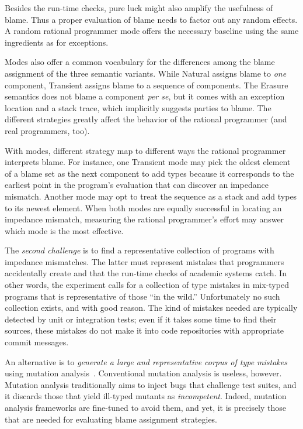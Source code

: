 Besides the run-time checks, pure luck might also amplify the usefulness
of blame. Thus a proper evaluation of blame needs to factor out any random
effects. A random rational programmer mode offers the necessary baseline
using the same ingredients as for exceptions. 


Modes also offer a common vocabulary for the differences among the blame
assignment of the three semantic variants.  While Natural assigns blame to
{\em one\/} component, Transient assigns blame to a sequence of
components. The Erasure semantics does not blame a component {\it per
se\/}, but it comes with an exception location and a stack trace, which
implicitly suggests parties to blame.  The different strategies greatly
affect the behavior of the rational programmer (and real programmers,
too).

With modes, different strategy map to different ways the rational
programmer  interprets blame.  For instance, one Transient mode may pick
the oldest element of a blame set as the next component to add types
because it corresponds to the earliest point in the program's evaluation
that can discover an impedance mismatch.  Another mode may opt to treat
the sequence as a stack and add types to its newest element.  When both
modes are equally successful in locating an impedance mismatch, measuring
the rational programmer's effort may answer which mode is the most
effective.



The {\em second challenge\/} is to find a representative collection of
programs with impedance mismatches. The latter must represent mistakes that programmers
accidentally create and that the run-time checks of academic systems catch. In
other words, the experiment calls for a collection of type mistakes in
mix-typed programs that is representative of those ``in the wild.''
Unfortunately no such collection exists, and with good reason. The kind of
mistakes needed are typically detected by unit or integration tests; even if it
takes some time to find their sources, these mistakes do not make it into code
repositories with appropriate commit messages.

An alternative is to {\em generate a large and representative corpus of type
mistakes \/} using mutation analysis~\cite{lipton1971fault, demillo1978hints,
jia2011analysis}. Conventional mutation analysis is useless, however.  Mutation
analysis traditionally aims to inject bugs that challenge test suites, and it
discards those that yield ill-typed mutants as \emph{incompetent}. Indeed,
mutation analysis frameworks are fine-tuned to avoid them, and yet, it is
precisely those that are needed for evaluating blame assignment strategies.

